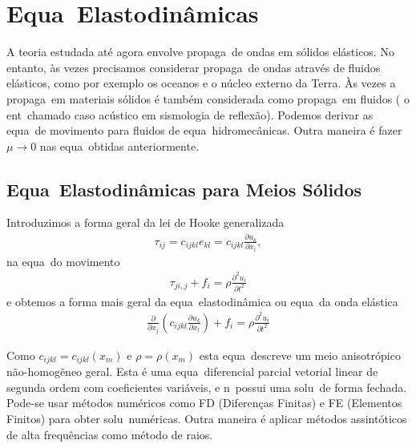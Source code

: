 \section{Equa\coes\ Elastodin\^amicas}

A teoria estudada at\'e agora envolve propaga\cao\ de ondas em s\'olidos
el\'asticos. No entanto, \`as vezes precisamos considerar propaga\cao\
de ondas atrav\'es de fluidos el\'asticos, como por exemplo os oceanos e
o n\'ucleo externo da Terra. \`As vezes a propaga\cao\ em materiais
s\'olidos \'e tamb\'em considerada como propaga\cao\ em fluidos ( o
ent\ao\ chamado caso ac\'ustico em sismologia de reflex\~ao). Podemos
derivar as equa\coes\ de movimento para fluidos de equa\coes\
hidromec\^anicas. Outra maneira \'e fazer $\mu \longrightarrow 0$ nas
equa\coes\ obtidas anteriormente.

\subsection{Equa\coes\ Elastodin\^amicas para Meios S\'olidos}

Introduzimos a forma geral da lei de Hooke generalizada
\begin{eqnarray*}
\tau_{ij} = c_{ijkl}e_{kl} = c_{ijkl}\frac{\partial u_k}{\partial x_l},
\end{eqnarray*}
na equa\cao\ do movimento
\begin{eqnarray*}
\tau_{ji,j} + f_{i} = \rho\frac{\partial^2 u_i}{\partial t^2}
\end{eqnarray*}
e obtemos a forma mais geral da equa\cao\ elastodin\^amica ou equa\cao\
da onda el\'astica
\begin{eqnarray}
\frac{\partial}{\partial x_j}\left(c_{ijkl}\frac{\partial u_k}{\partial x_l}\right) + f_i
= \rho\frac{\partial^2 u_i}{\partial t^2}
\end{eqnarray}

Como $c_{ijkl} = c_{ijkl}(x_m)$ e $\rho = \rho(x_m)$ esta equa\cao\
descreve um meio anisotr\'opico n\~ao-homog\~eneo geral. Esta \'e uma
equa\cao\ diferencial parcial vetorial linear de segunda ordem com
coeficientes vari\'aveis, e n\ao\ possui uma solu\cao\ de forma fechada.
Pode-se usar m\'etodos num\'ericos como FD (Diferen\c cas Finitas) e FE
(Elementos Finitos) para obter solu\coes\ num\'ericas. Outra maneira \'e
aplicar m\'etodos assint\'oticos de alta frequ\^encias como m\'etodo de
raios.

